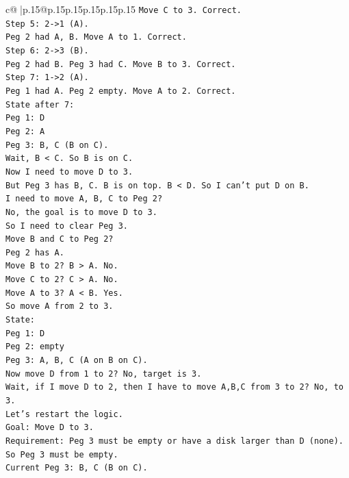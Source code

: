 \documentclass{article}
\begin{document}
{\begin{supertabular}{c@{$\;$}|p{.15\linewidth}@{}p{.15\linewidth}p{.15\linewidth}p{.15\linewidth}p{.15\linewidth}p{.15\linewidth}}
{{{\texttt{Move C to 3. Correct.} \\
\texttt{Step 5: 2{-}>1 (A).} \\
\texttt{Peg 2 had A, B. Move A to 1. Correct.} \\
\texttt{Step 6: 2{-}>3 (B).} \\
\texttt{Peg 2 had B. Peg 3 had C. Move B to 3. Correct.} \\
\texttt{Step 7: 1{-}>2 (A).} \\
\texttt{Peg 1 had A. Peg 2 empty. Move A to 2. Correct.} \\
\texttt{State after 7:} \\
\texttt{Peg 1: D} \\
\texttt{Peg 2: A} \\
\texttt{Peg 3: B, C (B on C).} \\
\texttt{Wait, B < C. So B is on C.} \\
\texttt{Now I need to move D to 3.} \\
\texttt{But Peg 3 has B, C. B is on top. B < D. So I can't put D on B.} \\
\texttt{I need to move A, B, C to Peg 2?} \\
\texttt{No, the goal is to move D to 3.} \\
\texttt{So I need to clear Peg 3.} \\
\texttt{Move B and C to Peg 2?} \\
\texttt{Peg 2 has A.} \\
\texttt{Move B to 2? B > A. No.} \\
\texttt{Move C to 2? C > A. No.} \\
\texttt{Move A to 3? A < B. Yes.} \\
\texttt{So move A from 2 to 3.} \\
\texttt{State:} \\
\texttt{Peg 1: D} \\
\texttt{Peg 2: empty} \\
\texttt{Peg 3: A, B, C (A on B on C).} \\
\texttt{Now move D from 1 to 2? No, target is 3.} \\
\texttt{Wait, if I move D to 2, then I have to move A,B,C from 3 to 2? No, to 3.} \\
\texttt{Let's restart the logic.} \\
\texttt{Goal: Move D to 3.} \\
\texttt{Requirement: Peg 3 must be empty or have a disk larger than D (none). So Peg 3 must be empty.} \\
\texttt{Current Peg 3: B, C (B on C).} \\
}}}
\end{supertabular}}
\end{document}
